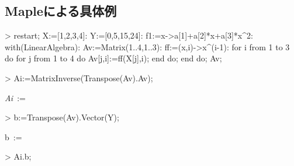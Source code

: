 \subsection{Mapleによる具体例}
\begin{MapleInput}
> restart; X:=[1,2,3,4]: Y:=[0,5,15,24]: 
  f1:=x->a[1]+a[2]*x+a[3]*x^2:
  with(LinearAlgebra): Av:=Matrix(1..4,1..3):
  ff:=(x,i)->x^(i-1):
  for i from 1 to 3 do 
    for j from 1 to 4 do
      Av[j,i]:=ff(X[j],i); 
    end do; 
  end do;
  Av;
\end{MapleInput}
\begin{MapleOutput}
\end{MapleOutput}
\begin{MapleInput}
> Ai:=MatrixInverse(Transpose(Av).Av);
\end{MapleInput}
\begin{MapleOutput}
{\it Ai}\, := \, 
\end{MapleOutput}
\begin{MapleInput}
> b:=Transpose(Av).Vector(Y);
\end{MapleInput}
\begin{MapleOutput}
b\, := \, \left[ \begin {array}{c} 44\\151\\539\end {array} \right]
\end{MapleOutput}

\begin{MapleInput}
> Ai.b;
\end{MapleInput}
\begin{MapleOutput}
\end{MapleOutput}
